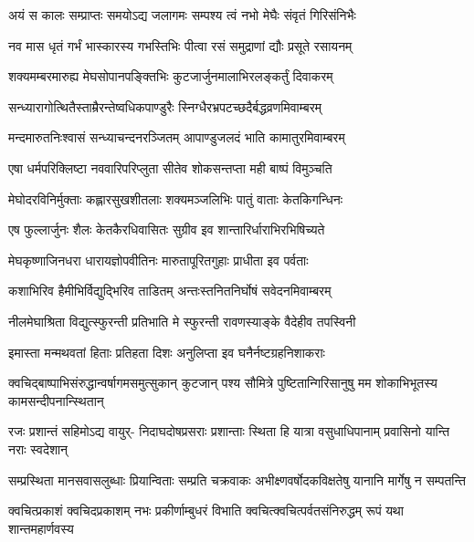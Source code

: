 \twolineshloka
{अयं स कालः सम्प्राप्तः समयोऽद्य जलागमः}
{सम्पश्य त्वं नभो मेघैः संवृतं गिरिसंनिभैः} %

\twolineshloka
{नव मास धृतं गर्भं भास्कारस्य गभस्तिभिः}
{पीत्वा रसं समुद्राणां द्यौः प्रसूते रसायनम्} %

\twolineshloka
{शक्यमम्बरमारुह्य मेघसोपानपङ्क्तिभिः}
{कुटजार्जुनमालाभिरलङ्कर्तुं दिवाकरम्} %

\twolineshloka
{सन्ध्यारागोत्थितैस्ताम्रैरन्तेष्वधिकपाण्डुरैः}
{स्निग्धैरभ्रपटच्छदैर्बद्धव्रणमिवाम्बरम्} %

\twolineshloka
{मन्दमारुतनिःश्वासं सन्ध्याचन्दनरञ्जितम्}
{आपाण्डुजलदं भाति कामातुरमिवाम्बरम्} %

\twolineshloka
{एषा धर्मपरिक्लिष्टा नववारिपरिप्लुता}
{सीतेव शोकसन्तप्ता मही बाष्पं विमुञ्चति} %

\twolineshloka
{मेघोदरविनिर्मुक्ताः कह्लारसुखशीतलाः}
{शक्यमञ्जलिभिः पातुं वाताः केतकिगन्धिनः} %

\twolineshloka
{एष फुल्लार्जुनः शैलः केतकैरधिवासितः}
{सुग्रीव इव शान्तारिर्धाराभिरभिषिच्यते} %

\twolineshloka
{मेघकृष्णाजिनधरा धारायज्ञोपवीतिनः}
{मारुतापूरितगुहाः प्राधीता इव पर्वताः} %

\twolineshloka
{कशाभिरिव हैमीभिर्विद्युद्भिरिव ताडितम्}
{अन्तःस्तनितनिर्घोषं सवेदनमिवाम्बरम्} %

\twolineshloka
{नीलमेघाश्रिता विद्युत्स्फुरन्ती प्रतिभाति मे}
{स्फुरन्ती रावणस्याङ्के वैदेहीव तपस्विनी} %

\twolineshloka
{इमास्ता मन्मथवतां हिताः प्रतिहता दिशः}
{अनुलिप्ता इव घनैर्नष्टग्रहनिशाकराः} %

\threelineshloka
{क्वचिद्बाष्पाभिसंरुद्धान्वर्षागमसमुत्सुकान्}
{कुटजान् पश्य सौमित्रे पुष्टितान्गिरिसानुषु}
{मम शोकाभिभूतस्य कामसन्दीपनान्स्थितान्} %

\fourlineindentedshloka
{रजः प्रशान्तं सहिमोऽद्य वायुर्-}
{निदाघदोषप्रसराः प्रशान्ताः}
{स्थिता हि यात्रा वसुधाधिपानाम्}
{प्रवासिनो यान्ति नराः स्वदेशान्} %

\fourlineindentedshloka
{सम्प्रस्थिता मानसवासलुब्धाः}
{प्रियान्विताः सम्प्रति चक्रवाकः}
{अभीक्ष्णवर्षोदकविक्षतेषु}
{यानानि मार्गेषु न सम्पतन्ति} %

\fourlineindentedshloka
{क्वचित्प्रकाशं क्वचिदप्रकाशम्}
{नभः प्रकीर्णाम्बुधरं विभाति}
{क्वचित्क्वचित्पर्वतसंनिरुद्धम्}
{रूपं यथा शान्तमहार्णवस्य} %

